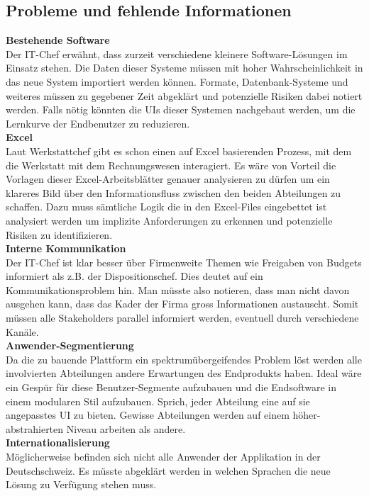\subsection{Probleme und fehlende Informationen}
%
  \textbf{Bestehende Software}\\
  Der IT-Chef erwähnt, dass zurzeit verschiedene kleinere Software-Lösungen im Einsatz stehen.
  Die Daten dieser Systeme müssen mit hoher Wahrscheinlichkeit in das neue System importiert werden können.
  Formate, Datenbank-Systeme und weiteres müssen zu gegebener Zeit abgeklärt und potenzielle Risiken dabei notiert werden.
  Falls nötig könnten die UIs dieser Systemen nachgebaut werden, um die Lernkurve der Endbenutzer zu reduzieren.\\[2ex]
%
  \textbf{Excel}\\
  Laut Werkstattchef gibt es schon einen auf Excel basierenden Prozess, mit dem die Werkstatt mit dem Rechnungswesen interagiert.
  Es wäre von Vorteil die Vorlagen dieser Excel-Arbeitsblätter genauer analysieren zu dürfen um ein klareres Bild über den Informationsfluss zwischen den beiden Abteilungen zu schaffen.
  Dazu muss sämtliche Logik die in den Excel-Files eingebettet ist analysiert werden um implizite Anforderungen zu erkennen und potenzielle Risiken zu identifizieren.\\[2ex]
  \textbf{Interne Kommunikation}\\
  Der IT-Chef ist klar besser über Firmenweite Themen wie Freigaben von Budgets informiert als z.B. der Dispositionschef. Dies deutet auf ein Kommunikationsproblem hin.
  Man müsste also notieren, dass man nicht davon ausgehen kann, dass das Kader der Firma gross Informationen austauscht. Somit müssen alle Stakeholders parallel informiert werden, eventuell durch verschiedene Kanäle.\\[2ex]
%
  \textbf{Anwender-Segmentierung}\\
  Da die zu bauende Plattform ein spektrumübergeifendes Problem löst werden alle involvierten Abteilungen andere Erwartungen des Endprodukts haben.
  Ideal wäre ein Gespür für diese Benutzer-Segmente aufzubauen und die Endsoftware in einem modularen Stil aufzubauen. Sprich, jeder Abteilung eine auf sie angepasstes UI zu bieten.
  Gewisse Abteilungen werden auf einem höher-abstrahierten Niveau arbeiten als andere.\\[2ex]
  \textbf{Internationalisierung}\\
  Möglicherweise befinden sich nicht alle Anwender der Applikation in der Deutschschweiz. Es müsste abgeklärt werden in welchen Sprachen die neue Lösung zu Verfügung stehen muss.
